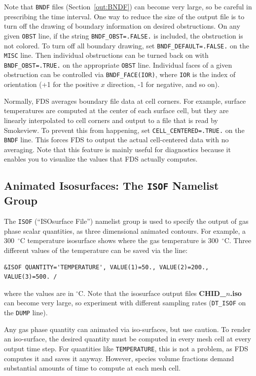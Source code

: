 \documentclass[11pt]{book}
\newcommand{\ct}{\tt\small}
\begin{document}
Note that {\ct BNDF} files (Section~\ref{out:BNDF}) can become very
large, so be careful in prescribing the time interval.
One way to reduce the size of the output file is to turn off the
drawing of boundary information on desired obstructions. On any given
{\ct OBST} line, if the string {\ct BNDF\_OBST=.FALSE.} is included,
the obstruction is not colored. To turn off all boundary drawing,
set {\ct BNDF\_DEFAULT=.FALSE.} on the {\ct MISC} line. Then individual
obstructions can be turned back on with {\ct BNDF\_OBST=.TRUE.} on
the appropriate {\ct OBST} line. Individual faces of a given obstruction can be controlled
via {\ct BNDF\_FACE(IOR)}, where {\ct IOR} is the index of orientation (+1 for the positive $x$ direction, -1 for negative, and so on).

Normally, FDS averages boundary file data at cell corners. For example, surface temperatures are computed at the center of each surface cell, but they
are linearly interpolated to cell corners and output to a file that is read by Smokeview. To prevent this from happening,
set {\ct CELL\_CENTERED=.TRUE.} on the {\ct BNDF} line. This forces FDS to output the actual cell-centered data with no averaging. Note that this
feature is mainly useful for diagnostics because it enables you to visualize the values that FDS actually computes.



\subsection{Animated Isosurfaces: The \texorpdfstring{{\tt ISOF}}{ISOF} Namelist Group}
\label{info:ISOF}

The {\ct ISOF} (``ISOsurface File'') namelist group is used to specify the output of
gas phase scalar quantities, as three dimensional animated contours.
For example, a 300~$^\circ$C temperature isosurface shows where the gas temperature is
300~$^\circ$C.
Three different values of the temperature can be saved via the line:

\footnotesize
\begin{verbatim}
&ISOF QUANTITY='TEMPERATURE', VALUE(1)=50., VALUE(2)=200., VALUE(3)=500. /
\end{verbatim}
\normalsize

\noindent
where the values are in $^\circ$C. Note that the isosurface output
files {\bf CHID\_$n$.iso} can become very large, so experiment with different sampling rates ({\ct DT\_ISOF} on the {\ct DUMP} line).


Any gas phase quantity can animated via iso-surfaces, but use caution. To render an iso-surface, the desired quantity must be
computed in every mesh cell at every output time step. For quantities like {\ct TEMPERATURE}, this is not a problem, as FDS computes it and saves it
anyway. However, species volume fractions demand substantial amounts of time to compute at each mesh cell.
\end{document}
